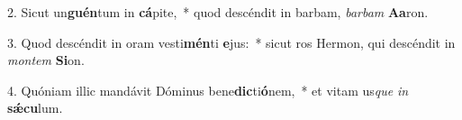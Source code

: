 2. Sicut un\textbf{guén}tum in \textbf{cá}pite,~*  quod descéndit in barbam, \textit{bar}\textit{bam} \textbf{A}\textbf{a}ron.\

3. Quod descéndit in oram vesti\textbf{mén}ti \textbf{e}jus:~*  sicut ros Hermon, qui descéndit in \textit{mon}\textit{tem} \textbf{Si}on.\

4. Quóniam illic mandávit Dóminus bene\textbf{dic}ti\textbf{ó}nem,~*  et vitam us\textit{que} \textit{in} \textbf{sǽ}\textbf{cu}lum.\

